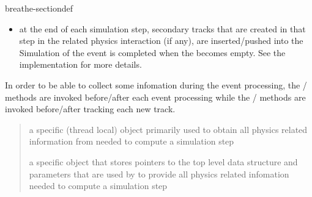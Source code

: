 \documentclass[letterpaper,10pt,english]{sphinxmanual}
\begin{document}
\begin{fulllineitems}
\begin{sphinxuseclass}{breathe-sectiondef}
\begin{fulllineitems}
\begin{itemize}
\item {} 
\sphinxAtStartPar
at the end of each simulation step, secondary tracks that are created in that step in the related physics interaction (if any), are inserted/pushed into the  Simulation of the event is completed when the  becomes empty. See the implementation for more details.

\end{itemize}


\sphinxAtStartPar
In order to be able to collect some infomation during the event processing, the / methods are invoked before/after each event processing while the / methods are invoked before/after tracking each new track.

\sphinxAtStartPar
\begin{quote}\begin{description}
\sphinxAtStartPar
a  specific (thread local) object primarily used to obtain all physics related information from  needed to compute a simulation step 

\sphinxAtStartPar
a  specific object that stores pointers to the top level  data structure and parameters that are used by  to provide all physics related infomation needed to compute a simulation step 


\end{description}
\end{quote}
\end{fulllineitems}
\end{sphinxuseclass}
\end{fulllineitems}
\end{document}
